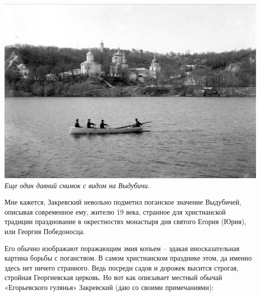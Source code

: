 \begin{center}
\includegraphics[width=\linewidth]{chast-vosp/zver/069.jpg}
\textit{Еще один давний снимок с видом на Выдубичи.}
\end{center}
\vspace*{\fill}
\newpage

Мне кажется, Закревский невольно подметил поганское значение Выдубичей, описывая современное ему, жителю 19 века, странное для христианской традиции празднование в окрестностях монастыря дня святого Егория (Юрия), или Георгия Победоносца. 

Его обычно изображают поражающим змия копьем – эдакая иносказательная картина борьбы с поганством. В самом христианском празднике этом, да именно здесь нет ничего странного. Ведь посреди садов и дорожек высится строгая, стройная Георгиевская церковь. Но вот как описывает местный обычай «Егорьевского гулянья» Закревский (даю со своими примечаниями):

